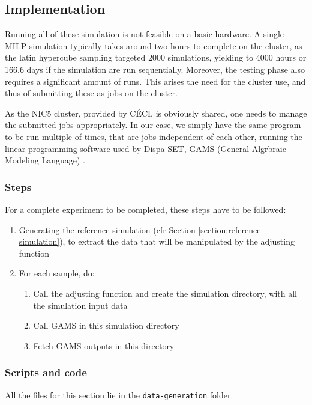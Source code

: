 \subsection{Implementation}

Running all of these simulation is not feasible on a basic hardware. A single MILP simulation typically takes around two hours to complete on the cluster, as the latin hypercube sampling targeted 2000 simulations, yielding to 4000 hours or 166.6 days if the simulation are run sequentially. Moreover, the testing phase also requires a significant amount of runs. This arises the need for the cluster use, and thus of submitting these as jobs on the cluster.

As the NIC5 cluster, provided by CÉCI, is obviously shared, one needs to manage the submitted jobs appropriately. In our case, we simply have the same program to be run multiple of times, that are jobs independent of each other, running the linear programming software used by Dispa-SET, GAMS (General Algrbraic Modeling Language) \cite{GAMS}.

\subsubsection{Steps}
For a complete experiment to be completed, these steps have to be followed:
\begin{enumerate}
    \item Generating the reference simulation (cfr Section \ref{section:reference-simulation}), to extract the data that will be manipulated by the adjusting function
    \item For each sample, do:
    \begin{enumerate}
        \item Call the adjusting function and create the simulation directory, with all the simulation input data
        \item Call GAMS in this simulation directory
        \item Fetch GAMS outputs in this directory
    \end{enumerate}
\end{enumerate}

\subsubsection{Scripts and code}

All the files for this section lie in the \texttt{data-generation} folder.

